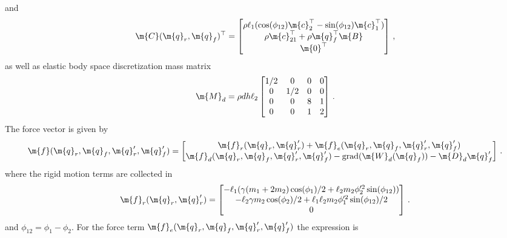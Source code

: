 %
and
%
\begin{equation*}
  \m{C}(\m{q}_{r}, \m{q}_{f}^{\phantom{\prime}})^\top = \begin{bmatrix}
    \rho \ell_1(\cos(\phi_{12})\m{c}_2^\top - \sin(\phi_{12})\m{c}_1^\top) \\
    \rho\m{c}_{21}^\top + \rho\m{q}_{f}^\top\m{B} \\
    \m{0}^\top
  \end{bmatrix} \, \text{,}
\end{equation*}
%
as well as elastic body space discretization mass matrix
%
\begin{equation*}
  \m{M}_{d} = \rho d h \ell_2 \begin{bmatrix}
    1/2 & 0   & 0 & 0 \\
    0   & 1/2 & 0 & 0 \\
    0   & 0   & 8 & 1 \\
    0   & 0   & 1 & 2
  \end{bmatrix} \, \text{.}
\end{equation*}
%
The force vector is given by
%
\begin{equation*}
  \m{f}(\m{q}_{r}, \m{q}_{f}^{\phantom{\prime}}, \m{q}_{r}^\prime, \m{q}_{f}^\prime) = \begin{bmatrix}
    \m{f}_r(\m{q}_{r}, \m{q}_{r}^\prime) + \m{f}_e(\m{q}_{r}, \m{q}_{f}^{\phantom{\prime}}, \m{q}_{r}^\prime, \m{q}_{f}^\prime) \\
    \m{f}_{d}(\m{q}_{r}, \m{q}_{f}^{\phantom{\prime}}, \m{q}_{r}^\prime, \m{q}_{f}^\prime) - \mathrm{grad}(\m{W}_{d}(\m{q}_{f}^{\phantom{\prime}})) - \m{D}_{d} \m{q}_{f}^\prime
  \end{bmatrix} \, \text{.}
\end{equation*}
%
where the rigid motion terms are collected in
%
\begin{equation*}
  \m{f}_r(\m{q}_{r}, \m{q}_{r}^\prime) = \begin{bmatrix}
    -\ell_1(\gamma(m_1 + 2m_2) \cos(\phi_1)/2 + \ell_2 m_2 \phi_2^{\prime2} \sin(\phi_{12})) \\
    -\ell_2 \gamma m_2 \cos(\phi_2)/2 + \ell_1 \ell_2 m_2 \phi_1^{\prime2} \sin(\phi_{12})/2 \\
    0
  \end{bmatrix} \, \text{.}
\end{equation*}
%
and $\phi_{12} = \phi_1 - \phi_2$. For the force term $\m{f}_e(\m{q}_{r}, \m{q}_{f}^{\phantom{\prime}}, \m{q}_{r}^\prime, \m{q}_{f}^\prime)$ the expression is
%
